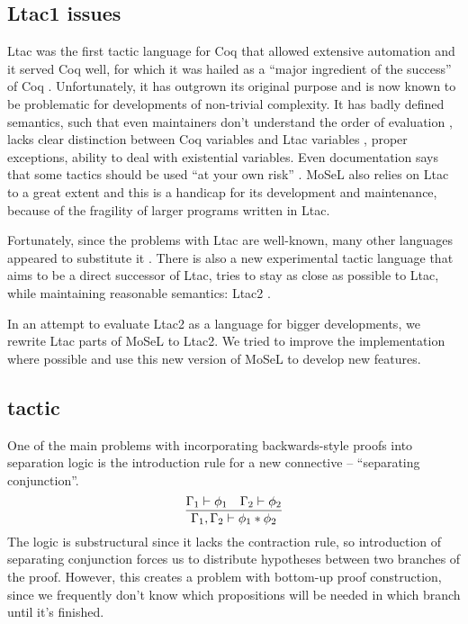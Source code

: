 \subsection{Ltac1 issues}
\label{sec:ltac1-issues}
Ltac was the first tactic language for Coq that allowed extensive automation and it served Coq well, for which it was hailed as a ``major ingredient of the success'' of Coq \cite{pedrotLtac2TacticalWarfare2019}.
Unfortunately, it has outgrown its original purpose and is now known to be problematic for developments of non-trivial complexity.
It has badly defined semantics, such that even maintainers don't understand the order of evaluation \cite{pedrotLtacInternals2016}, lacks clear distinction between Coq variables and Ltac variables \cite{pedrotLtacInternals2016}, proper exceptions, ability to deal with existential variables.
Even documentation says that some tactics should be used ``at your own risk'' \cite[Section~3.3.1]{thecoqdevelopmentteamCoqProofAssistant2020}.
MoSeL also relies on Ltac to a great extent and this is a handicap for its development and maintenance, because of the fragility of larger programs written in Ltac.

Fortunately, since the problems with Ltac are well-known, many other languages appeared to substitute it \cite{malechaExtensibleEfficientAutomation2016, zilianiMtacMonadTyped2013, kaiserMtac2TypedTactics2018a, tassiElpiExtensionLanguage2018}.
There is also a new experimental tactic language that aims to be a direct successor of Ltac, tries to stay as close as possible to Ltac, while maintaining reasonable semantics: Ltac2 \cite{pedrotLtac2TacticalWarfare2019}.

In an attempt to evaluate Ltac2 as a language for bigger developments, we rewrite Ltac parts of MoSeL to Ltac2.
We tried to improve the implementation where possible and use this new version of MoSeL to develop new features.

\subsection{ tactic}
\label{sec:isplit-tactic}

One of the main problems with incorporating backwards-style proofs into separation logic is the introduction rule for a new connective -- ``separating conjunction''.
\[\infer{\Gamma_1, \Gamma_2 \vdash \phi_1 \ast \phi_2}
        {\Gamma_1 \vdash \phi_1 &
         \Gamma_2 \vdash \phi_2} \]
The logic is substructural since it lacks the contraction rule, so introduction of separating conjunction forces us to distribute hypotheses between two branches of the proof.
However, this creates a problem with bottom-up proof construction, since we frequently don't know which propositions will be needed in which branch until it's finished.

